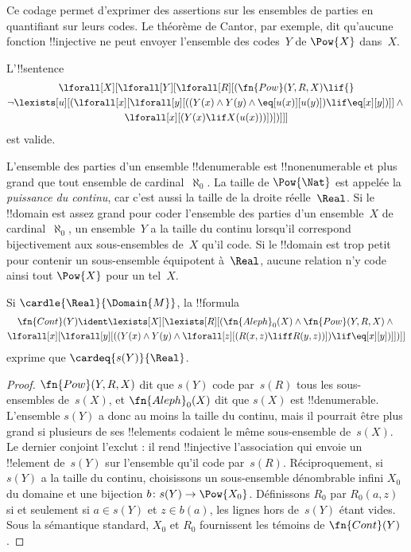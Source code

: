 \documentclass[../../../include/open-logic-section]{subfiles}
\begin{document}
\begin{explain}
Ce codage permet d'exprimer des assertions sur
les ensembles de parties en quantifiant sur
leurs codes. Le théorème de Cantor, par exemple,
dit qu'aucune fonction !!{injective} ne peut
envoyer l'ensemble des codes~$Y$ de
$\Pow{X}$ dans~$X$.
\end{explain}

\begin{prop}
L'!!{sentence}
\begin{multline*}
\lforall[X][\lforall[Y][\lforall[R][(
\fn{Pow}(Y,R,X)\lif{}\\
\lnot\lexists[u][(
\lforall[x][\lforall[y][((Y(x)\land Y(y)\land
\eq[u(x)][u(y)])\lif\eq[x][y])]]\land{}\\
\lforall[x][(Y(x)\lif X(u(x)))])])]]]
\end{multline*}
est valide.
\end{prop}

\begin{explain}
L'ensemble des parties d'un ensemble
!!{denumerable} est !!{nonenumerable} et
plus grand que tout ensemble de cardinal~$\aleph_0$.
La taille de $\Pow{\Nat}$ est appelée la
\emph{puissance du continu}, car c'est aussi
la taille de la droite réelle~$\Real$.
Si le !!{domain} est assez grand pour coder
l'ensemble des parties d'un ensemble~$X$ de
cardinal~$\aleph_0$, un ensemble~$Y$ a la
taille du continu lorsqu'il correspond
bijectivement aux sous-ensembles de~$X$ qu'il
code. Si le !!{domain} est trop petit pour
contenir un sous-ensemble équipotent à~$\Real$,
aucune relation n'y code ainsi tout
$\Pow{X}$ pour un tel~$X$.
\end{explain}

\begin{prop}
Si $\cardle{\Real}{\Domain{M}}$, la !!{formula}
\begin{multline*}
\fn{Cont}(Y)\ident
\lexists[X][\lexists[R][(
\fn{Aleph}_0(X)\land\fn{Pow}(Y,R,X)\land{}\\
\lforall[x][\lforall[y][((Y(x)\land Y(y)\land
\lforall[z][(R(x,z)\liff R(y,z))])
\lif\eq[x][y])]])]]
\end{multline*}
exprime que $\cardeq{s(Y)}{\Real}$.
\end{prop}

\begin{proof}
$\fn{Pow}(Y,R,X)$ dit que $s(Y)$ code
par~$s(R)$ tous les sous-ensembles de~$s(X)$,
et $\fn{Aleph}_0(X)$ dit que $s(X)$ est
!!{denumerable}. L'ensemble $s(Y)$ a donc
au moins la taille du continu, mais il
pourrait être plus grand si plusieurs de ses
!!{element}s codaient le même sous-ensemble
de~$s(X)$. Le dernier conjoint l'exclut :
il rend !!{injective} l'association qui envoie
un !!{element} de~$s(Y)$ sur l'ensemble
qu'il code par~$s(R)$. Réciproquement, si $s(Y)$ a la taille du continu, choisissons un sous-ensemble dénombrable infini $X_0$ du domaine et une bijection $b\colon s(Y)\to\Pow{X_0}$. Définissons $R_0$ par $R_0(a,z)$ si et seulement si $a\in s(Y)$ et $z\in b(a)$, les lignes hors de~$s(Y)$ étant vides. Sous la sémantique standard, $X_0$ et $R_0$ fournissent les témoins de $\fn{Cont}(Y)$.
\end{proof}
\end{document}
